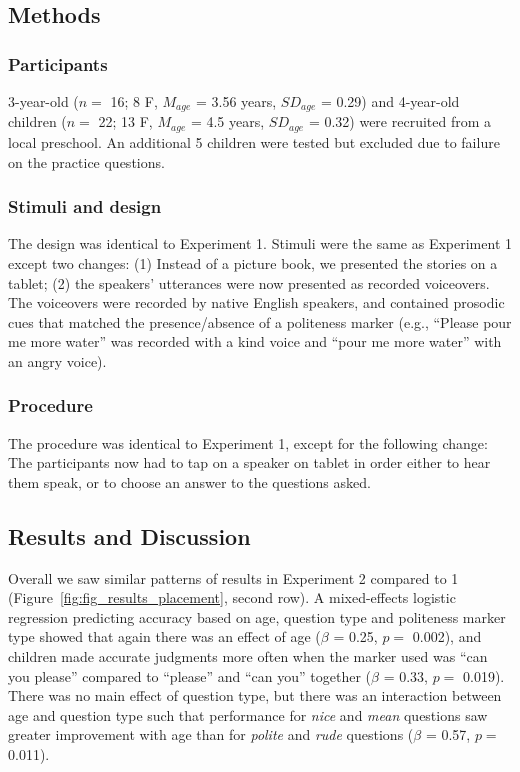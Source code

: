 \documentclass[10pt, letterpaper]{article}
\begin{document}
\subsection{Methods}\label{methods}

\subsubsection{Participants}\label{participants-1}

3-year-old (\(n=\) 16; 8 F, \(M_{age}\) = 3.56 years, \(SD_{age}\) =
0.29) and 4-year-old children (\(n=\) 22; 13 F, \(M_{age}\) = 4.5 years,
\(SD_{age}\) = 0.32) were recruited from a local preschool. An
additional 5 children were tested but excluded due to failure on the
practice questions.

\subsubsection{Stimuli and design}\label{stimuli-and-design-1}

The design was identical to Experiment 1. Stimuli were the same as
Experiment 1 except two changes: (1) Instead of a picture book, we
presented the stories on a tablet; (2) the speakers' utterances were now
presented as recorded voiceovers. The voiceovers were recorded by native
English speakers, and contained prosodic cues that matched the
presence/absence of a politeness marker (e.g., ``Please pour me more
water'' was recorded with a kind voice and ``pour me more water'' with
an angry voice).

\subsubsection{Procedure}\label{procedure-1}

The procedure was identical to Experiment 1, except for the following
change: The participants now had to tap on a speaker on tablet in order
either to hear them speak, or to choose an answer to the questions
asked.

\subsection{Results and Discussion}\label{results-and-discussion-1}

Overall we saw similar patterns of results in Experiment 2 compared to 1
(Figure~\ref{fig:fig_results_placement}, second row). A mixed-effects
logistic regression predicting accuracy based on age, question type and
politeness marker type showed that again there was an effect of age
(\(\beta\) = 0.25, \(p =\) 0.002), and children made accurate judgments
more often when the marker used was ``can you please'' compared to
``please'' and ``can you'' together (\(\beta\) = 0.33, \(p =\) 0.019).
There was no main effect of question type, but there was an interaction
between age and question type such that performance for \emph{nice} and
\emph{mean} questions saw greater improvement with age than for
\emph{polite} and \emph{rude} questions (\(\beta\) = 0.57, \(p =\)
0.011).
\end{document}
